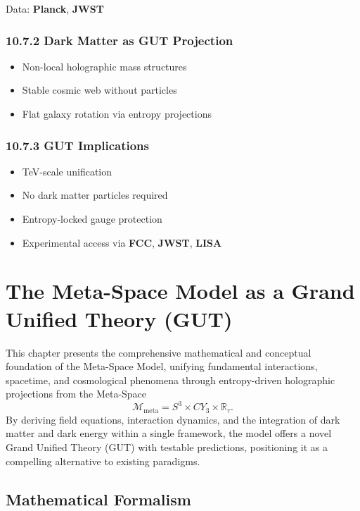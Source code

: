 \documentclass[10.5pt,a4paper]{article}
\begin{document}
Data: \textbf{Planck}, \textbf{JWST}

\subsubsection*{10.7.2 Dark Matter as GUT Projection}

\begin{itemize}
    \item Non-local holographic mass structures
    \item Stable cosmic web without particles
    \item Flat galaxy rotation via entropy projections
\end{itemize}

\subsubsection*{10.7.3 GUT Implications}

\begin{itemize}
    \item TeV-scale unification
    \item No dark matter particles required
    \item Entropy-locked gauge protection
    \item Experimental access via \textbf{FCC}, \textbf{JWST}, \textbf{LISA}
\end{itemize}

\clearpage

\section{The Meta-Space Model as a Grand Unified Theory (GUT)}

This chapter presents the comprehensive mathematical and conceptual foundation of the Meta-Space Model, unifying fundamental interactions, spacetime, and cosmological phenomena through entropy-driven holographic projections from the Meta-Space 
\[
\mathcal{M}_{\text{meta}} = S^3 \times CY_3 \times \mathbb{R}_\tau.
\]
By deriving field equations, interaction dynamics, and the integration of dark matter and dark energy within a single framework, the model offers a novel Grand Unified Theory (GUT) with testable predictions, positioning it as a compelling alternative to existing paradigms.

\subsection{Mathematical Formalism}
\end{document}
